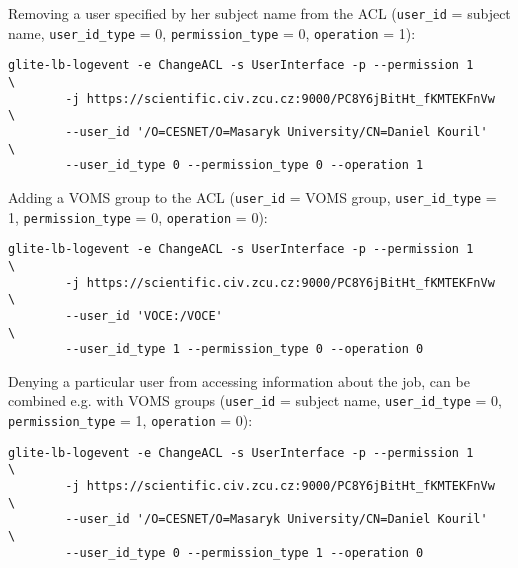 Removing a user specified by her subject name from the ACL (\verb'user_id' =
subject name, \verb'user_id_type' = 0, \verb'permission_type' = 0,
\verb'operation' = 1):

\begin{verbatim}
glite-lb-logevent -e ChangeACL -s UserInterface -p --permission 1       \
        -j https://scientific.civ.zcu.cz:9000/PC8Y6jBitHt_fKMTEKFnVw    \
        --user_id '/O=CESNET/O=Masaryk University/CN=Daniel Kouril'     \
        --user_id_type 0 --permission_type 0 --operation 1
\end{verbatim}

Adding a VOMS group to the ACL (\verb'user_id' = VOMS group,
\verb'user_id_type' = 1,  \verb'permission_type' = 0, \verb'operation' = 0):

\begin{verbatim}
glite-lb-logevent -e ChangeACL -s UserInterface -p --permission 1       \
        -j https://scientific.civ.zcu.cz:9000/PC8Y6jBitHt_fKMTEKFnVw    \
        --user_id 'VOCE:/VOCE'                                          \
        --user_id_type 1 --permission_type 0 --operation 0
\end{verbatim}

Denying a particular user from accessing information about the job, can be
combined e.g. with VOMS groups (\verb'user_id' = subject name,
\verb'user_id_type' = 0, \verb'permission_type' = 1, \verb'operation' = 0):

\begin{verbatim}
glite-lb-logevent -e ChangeACL -s UserInterface -p --permission 1       \
        -j https://scientific.civ.zcu.cz:9000/PC8Y6jBitHt_fKMTEKFnVw    \
        --user_id '/O=CESNET/O=Masaryk University/CN=Daniel Kouril'     \
        --user_id_type 0 --permission_type 1 --operation 0
\end{verbatim}

